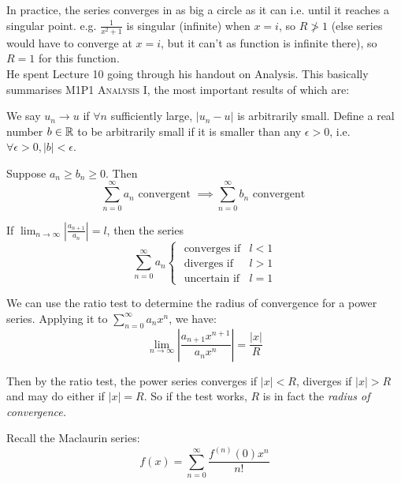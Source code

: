 \documentclass[10pt]{scrartcl}
\begin{document}
In practice, the series converges in as big a circle as it can i.e. until it reaches a singular point. e.g. $\frac{1}{x^2+1}$ is singular (infinite) when $x=i$, so $R \ngtr 1$ (else series would have to converge at $x = i$, but it can't as function is infinite there), so $R = 1$ for this function.\\


He spent Lecture 10  going through his handout on Analysis. This basically summarises \textsc{M1P1 Analysis I}, the most important results of which are: \\

\begin{definition}[Convergence]
We say $u_n \to u$ if $\forall n$ sufficiently large, $|u_n - u|$ is arbitrarily small. Define a real number $b \in\mathbb{R}$ to be arbitrarily small if it is smaller than any $\epsilon>0$, i.e. $\forall \epsilon >0, |b| < \epsilon$.
\end{definition}\vsp


\begin{theorem}
Suppose $a_n \geq b_n \geq 0$. Then 
\[\sum_{n=0}^{\infty} a_n \text{ convergent } \implies \sum_{n=0}^{\infty} b_n \text{ convergent }  \]	
\end{theorem}\vspace*{5pt}
 

\begin{theorem}
	If $\lim_{n\to \infty} \left|\frac{a_{n+1}}{a_n}\right| = l$, then the series 
	\[\sum_{n=0}^{\infty} a_n \begin{cases}
 \text{ converges if} & l < 1\\
 \text{ diverges if} & l > 1\\
 \text{ uncertain if} & l = 1	
 \end{cases}
\]
\end{theorem}

We can use the ratio test to determine the radius of convergence for a power series. Applying it to $\sum_{n=0}^{\infty} a_n x^n$, we have:  
\[\lim_{n\to \infty} \left|\frac{a_{n+1}x^{n+1}}{a_nx^n}\right| = \frac{|x|}{R}\]

Then by the ratio test, the power series converges if $|x| < R$, diverges if $|x| > R$ and may do either if $|x| = R$. So if the test works, $R$ is in fact the \emph{radius of convergence.}


Recall  
the Maclaurin series: 
\[f(x) = \sum_{n=0}^{\infty} \frac{f^{(n)}(0)x^n}{n!}\]
\end{document}
